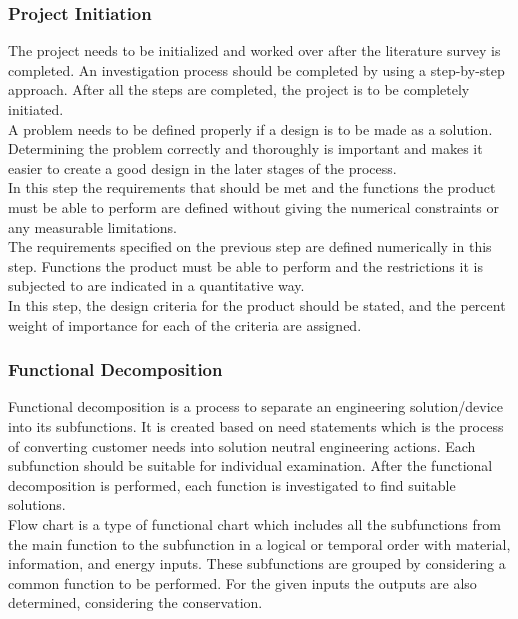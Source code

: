 \documentclass[12pt]{report}
\begin{document}
\subsubsection{Project Initiation}
The project needs to be initialized and worked over after the literature survey is completed. An investigation process should be completed by using a step-by-step approach. After all the steps are completed, the project is to be completely initiated. \\

A problem needs to be defined properly if a design is to be made as a solution. Determining the problem correctly and thoroughly is important and makes it easier to create a good design in the later stages of the process. \\

 In this step the requirements that should be met and the functions the product must be able to perform are defined without giving the numerical constraints or any measurable limitations. \\
 
The requirements specified on the previous step are defined numerically in this step. Functions the product must be able to perform and the restrictions it is subjected to are indicated in a quantitative way. \\

In this step, the design criteria for the product should be stated, and the percent weight of importance for each of the criteria are assigned. 

\subsubsection{Functional Decomposition}
Functional decomposition is a process to separate an engineering solution/device into its subfunctions. It is created based on need statements which is the process of converting customer needs into solution neutral engineering actions. Each subfunction should be suitable for individual examination. After the functional decomposition is performed, each function is investigated to find suitable solutions. \\

Flow chart is a type of functional chart which includes all the subfunctions from the main function to the subfunction in a logical or temporal order with material, information, and energy inputs. These subfunctions are grouped by considering a common function to be performed. For the given inputs the outputs are also determined, considering the conservation. \\
\end{document}
